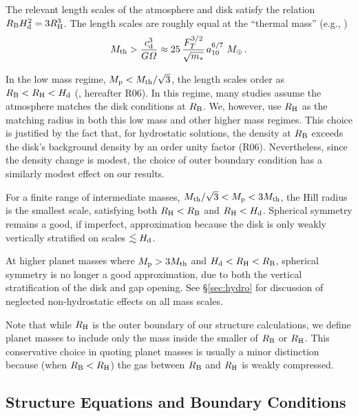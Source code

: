 \documentclass[apj, numberedappendix]{emulateapj}
\newcommand{\RB}{R_{\rm B}}
\newcommand{\RH}{R_{\rm H}}
\newcommand{\pla}{_{\rm p}}
\newcommand{\di}{_{\rm d}}
\newcommand{\aun}[1]{ a_{#1} }
\begin{document}
The relevant length scales of the atmosphere and disk satisfy the relation $\RB H\di^2 = 3 R_{\rm H}^3$.  The length scales are roughly equal at the ``thermal mass'' (e.g., \citealt{menou04})
\begin{equation}\label{eq:Mth}
M_{\rm th} > {c\di^{3} \over G \varOmega} \approx 25 \, {F_T^{3/2} \over \sqrt{m_\ast} } \, \aun{10}^{6/7}~ M_\oplus \, .
\end{equation} 

In the low mass regime, $M\pla < M_{\rm th}/\sqrt{3}$, the length scales order as $\RB< \RH<H\di$ (\citealt{rafikov06}, hereafter R06).  In this regime, many studies assume the atmosphere matches the disk conditions at $\RB$.  We, however, use $\RH$ as the matching radius in both this low mass and other higher mass regimes.  This choice is justified by the fact that, for hydrostatic solutions, the  density at $\RB$ exceeds the disk's background density by an order unity factor (R06).  Nevertheless, since the density change is modest, the choice of outer boundary condition has a similarly modest effect on our results. 

For a finite range of intermediate masses, $M_{\rm th}/\sqrt{3} < M\pla < 3 M_{\rm th}$, the Hill radius is the smallest scale, satisfying both $\RH < \RB$ and $\RH < H\di$.  Spherical symmetry remains a good, if imperfect, approximation because the disk is only weakly vertically stratified on  scales $\lesssim H\di$.  

At higher planet masses where $M\pla > 3 M_{\rm th}$ and $H\di < \RH < \RB$, spherical symmetry is no longer a good approximation, due to both the vertical stratification of the disk and gap opening.   See \S\ref{sec:hydro} for discussion of neglected non-hydrostatic effects on all mass scales.

Note that while $\RH$ is the outer boundary of our structure calculations, we define planet masses to include only the mass inside the smaller of $\RB$ or $\RH$.    This conservative choice in quoting planet masses is usually a minor distinction because (when $\RB < \RH$) the gas between $\RB$ and $\RH$ is weakly compressed.


\subsection{Structure Equations and Boundary Conditions}
\label{sec:struct}
\end{document}
